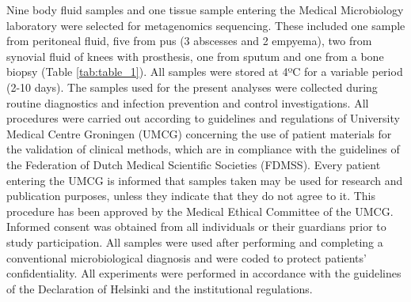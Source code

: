 Nine body fluid samples and one tissue sample entering the Medical Microbiology laboratory were selected for metagenomics sequencing. 
These included one sample from peritoneal fluid, five from pus (3 abscesses and 2 empyema), two from synovial fluid of knees with prosthesis, one from sputum and one from a bone biopsy (Table \ref{tab:table_1}). 
All samples were stored at 4ºC for a variable period (2-10 days). 
The samples used for the present analyses were collected during routine diagnostics and infection prevention and control investigations. 
All procedures were carried out according to guidelines and regulations of University Medical Centre Groningen (UMCG) concerning the use of patient materials for the validation of clinical methods, which are in compliance with the guidelines of the Federation of Dutch Medical Scientific Societies (FDMSS).
Every patient entering the UMCG is informed that samples taken may be used for research and publication purposes, unless they indicate that they do not agree to it. 
This procedure has been approved by the Medical Ethical Committee of the UMCG. 
Informed consent was obtained from all individuals or their guardians prior to study participation. 
All samples were used after performing and completing a conventional microbiological diagnosis and were coded to protect patients’ confidentiality. 
All experiments were performed in accordance with the guidelines of the Declaration of Helsinki and the institutional regulations. 

